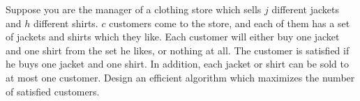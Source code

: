 \problem{}
Suppose you are the manager of a clothing store which sells $j$ different jackets and $h$ different shirts. $c$ customers come to the store, and each of them has a set of jackets and shirts which they like.  Each customer will either buy one jacket and one shirt from the set he likes, or nothing at all.  The customer is satisfied if he buys one jacket and one shirt.  In addition, each jacket or shirt can be sold to at most one customer.  Design an efficient algorithm which maximizes the number of satisfied customers. 

\solution{}
 
\newpage